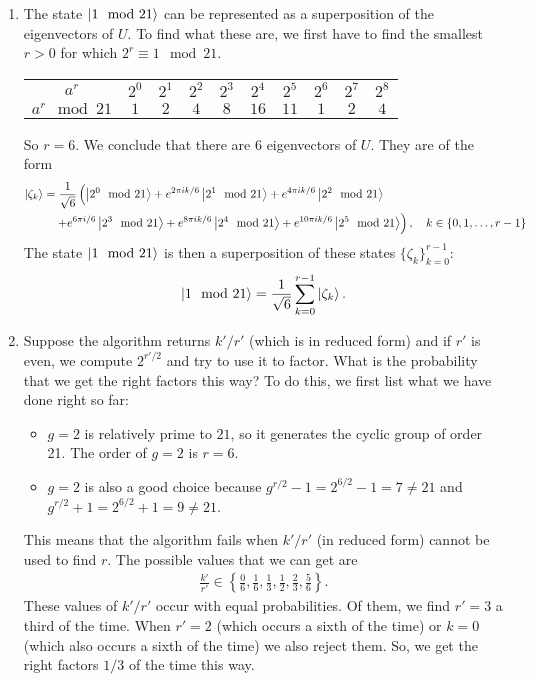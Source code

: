 \documentclass{article}
\theoremstyle{definition}
\newcommand{\f}[2]{\frac{#1}{#2}}
\newcommand{\lp}{\left(}
\newcommand{\rp}{\right)}
\newcommand{\lc}{\left\{}
\newcommand{\rc}{\right\}}
\begin{document}
\begin{enumerate}[label=(\alph*)]

\item The state $\ket{1 \mod 21}$ can be represented as a superposition of the  eigenvectors of $U$. To find what these are, we first have to find the smallest $r > 0$ for which $2^r \equiv 1 \mod 21$. 

\begin{center}
\begin{tabular}{ c | c  c  c c  c c c c c} 
 $a^r$  & $2^0$ & $2^1$ & $2^2$ & $2^3$ & $2^4$ & $2^5$  & $2^6$ & $2^7$ & $2^8$ \\ 
 $a^r \mod 21$  & $1$ & $2$ & $4$ & $8$ & $16$ & $11$  & $1$ & $2$ & $4$ \\ 
\end{tabular}
\end{center}

So $r = 6$. We conclude that there are $\boxed{6}$ eigenvectors of $U$. They are of the form
\begin{align*}
\ket{\zeta_k} &= \f{1}{\sqrt{6}} \lp \ket{2^0 \mod 21} + e^{2\pi i k/6} \ket{2^1 \mod 21}  +  e^{4\pi i k/6}\ket{2^2 \mod 21} \right. \\
&\left. \quad + e^{6\pi i /6} \ket{2^3 \mod 21} +  e^{8 \pi i k/6 }\ket{2^4 \mod 21} + e^{10 \pi i k/6} \ket{2^5\mod 21} \rp, \quad k \in \{ 0,1,\dots, r-1\}
\end{align*}  
The state $\ket{1\mod 21}$ is then a  superposition of these states $\{ \zeta_k \}_{k=0}^{r-1} $:
\begin{align*}
\ket{1\mod 21} =  \f{1}{\sqrt{6}} \sum_{k=0}^{r-1}  \ket{\zeta_{k}}.
\end{align*}


\item Suppose the algorithm returns $k'/r'$ (which is in reduced form) and if $r'$ is even, we compute $2^{r'/2}$ and try to use it to factor. What is the probability that we get the right factors this way? To do this, we first list what we have done right so far:
\begin{itemize}
\item $g=2$ is relatively prime to $21$, so it generates the cyclic group of order 21. The order of $g=2$ is $r=6$.

\item $g=2$ is also a good choice because $g^{r/2} - 1 = 2^{6/2}-1 = 7 \neq 21$ and $g^{r/2} + 1 = 2^{6/2}+1 = 9 \neq 21$. 
\end{itemize}
This means that the algorithm fails when $k'/r'$ (in reduced form) cannot be used to find $r$. The possible values that we can get are
\begin{align*}
\f{k'}{r'} \in \lc \f{0}{6}, \f{1}{6}, \f{1}{3}, \f{1}{2}, \f{2}{3}, \f{5}{6} \rc.
\end{align*}
These values of $k'/r'$ occur with equal probabilities. Of them, we find $r' = 3$ a third  of the time. When $r'=2$ (which occurs a sixth of the time) or $k=0$ (which also occurs a sixth of the time) we also reject them. So, we get the right factors $\boxed{1/3}$ of the time this way.

\end{enumerate}
\end{document}
